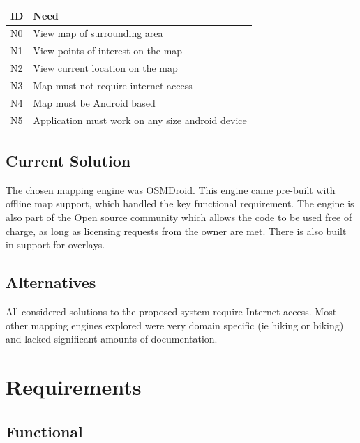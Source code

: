 \documentclass{article}
\begin{document}
\begin{tabular}{ | p{.5in} | p{4.5in} | }
\hline
\textbf{ID} & \textbf{Need}\\
\hline
\hline
N0 & View map of surrounding area\\
\hline
N1 & View points of interest on the map\\
\hline
N2 & View current location on the map\\
\hline
N3 & Map must not require internet access\\
\hline
N4 & Map must be Android based\\
\hline
N5 & Application must work on any size android device\\
\hline
\end{tabular}


\subsection{Current Solution}
The chosen mapping engine was OSMDroid. This engine came pre-built with offline map support, which handled the key functional requirement. The engine is also part of the Open source community which allows the code to be used free of charge, as long as licensing requests from the owner are met. There is also built in support for overlays.

\subsection{Alternatives}
All considered solutions to the proposed system require Internet access. Most other mapping engines explored were very domain specific (ie hiking or biking) and lacked significant amounts of documentation.

\section{Requirements}

\subsection{Functional}
\end{document}
